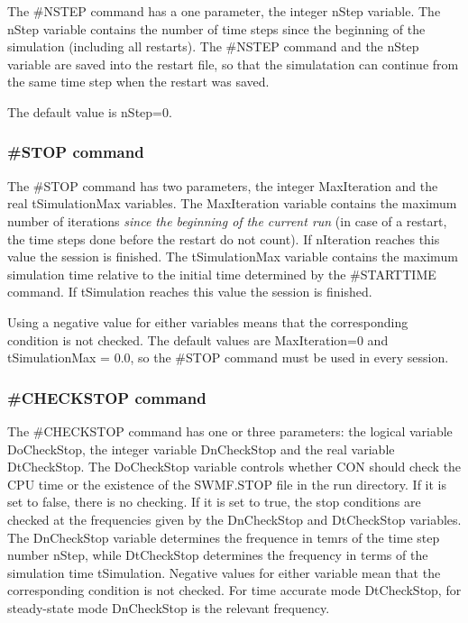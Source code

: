 The \#NSTEP command has a one parameter, the integer nStep variable.
The nStep variable contains the number of time steps since the 
beginning of the simulation (including all restarts). The \#NSTEP command
and the nStep variable  are saved into the restart
file, so that the simulatation can continue from the same time step when
the restart was saved.

The default value is nStep=0.

\subsubsection{\#STOP command}

The \#STOP command has two parameters, the integer MaxIteration and the
real tSimulationMax variables. The MaxIteration variable contains the
maximum number of iterations {\it since the beginning of the current run} 
(in case of a restart, the time steps done before the restart do not count).
If nIteration reaches this value the session is finished.
The tSimulationMax variable contains the maximum simulation time
relative to the initial time determined by the \#STARTTIME command.
If tSimulation reaches this value the session is finished.

Using a negative value for either variables means that the
corresponding condition is  not checked. The default values
are MaxIteration=0 and tSimulationMax = 0.0, so the \#STOP command
must be used in every session.

\subsubsection{\#CHECKSTOP command}

The \#CHECKSTOP command has one or three parameters: the logical variable
DoCheckStop, the integer variable DnCheckStop and the real variable
DtCheckStop. The DoCheckStop variable controls whether CON should
check the CPU time or the existence of the SWMF.STOP file in the
run directory. If it is set to false, there is no checking.
If it is set to true, the stop conditions are checked at the
frequencies given by the DnCheckStop and DtCheckStop variables.
The DnCheckStop variable determines the frequence in temrs of
the time step number nStep, while  DtCheckStop determines the
frequency in terms of the simulation time tSimulation.
Negative values for either variable mean that the corresponding condition 
is not checked. For time accurate mode DtCheckStop, for
steady-state mode DnCheckStop is the relevant frequency.

